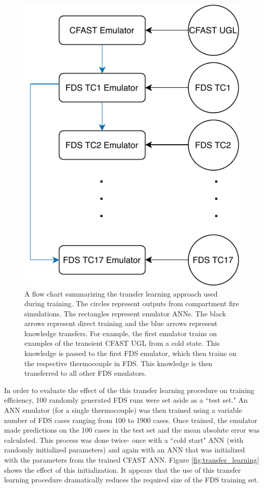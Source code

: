 \documentclass{article}
\begin{document}
\begin{figure}[htb] \centering
\includegraphics[width=.5\textwidth]{figures/transfer_learning_diagram.pdf}
\caption{A flow chart summarizing the transfer learning approach used during training. The circles represent outputs from compartment fire simulations. The rectangles represent emulator ANNs. The black arrows represent direct training and the blue arrows represent knowledge transfers. For example, the first emulator trains on examples of the transient CFAST UGL from a cold state. This knowledge is passed to the first FDS emulator, which then trains on the respective thermocouple in FDS. This knowledge is then transferred to all other FDS emulators.}
\label{fig:transfer_learning_diagram}
\end{figure}

In order to evaluate the effect of the this transfer learning procedure on training efficiency, 100 randomly generated FDS runs were set aside as a ``test set." An ANN emulator (for a single thermocouple) was then trained using a variable number of FDS cases ranging from 100 to 1900 cases. Once trained, the emulator made predictions on the 100 cases in the test set and the mean absolute error was calculated. This process was done twice- once with a ``cold start" ANN (with randomly initialized parameters) and again with an ANN that was initialized with the parameters from the trained CFAST ANN. Figure \ref{fig:transfer_learning} shows the effect of this initialization. It appears that the use of this transfer learning procedure dramatically reduces the required size of the FDS training set. 
\end{document}
